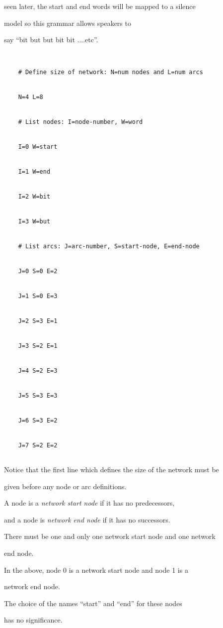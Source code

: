 seen later, the start and end words will be mapped to a silence


model so this grammar allows speakers to 


say ``bit but but bit bit ....etc''.


\begin{verbatim}


    # Define size of network: N=num nodes and L=num arcs


    N=4 L=8


    # List nodes: I=node-number, W=word


    I=0 W=start


    I=1 W=end


    I=2 W=bit


    I=3 W=but


    # List arcs: J=arc-number, S=start-node, E=end-node


    J=0 S=0 E=2


    J=1 S=0 E=3


    J=2 S=3 E=1


    J=3 S=2 E=1


    J=4 S=2 E=3


    J=5 S=3 E=3


    J=6 S=3 E=2


    J=7 S=2 E=2


\end{verbatim}


Notice that the first line which defines the size of the network must be


given before any node or arc definitions.


A node is a \textit{network start node} if it has no predecessors,


and a node is \textit{network end node} if it has no successors.


There must be one and only one network start node and one network


end node.


In the above, node 0 is a network start node and node 1 is a


network end node.


The choice of the names ``start'' and ``end'' for these nodes


has no significance.











